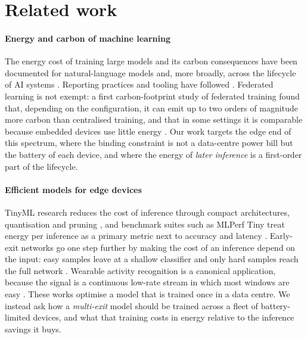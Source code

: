 \section{Related work}\label{sec:related}

\paragraph{Energy and carbon of machine learning}
The energy cost of training large models and its carbon consequences have been documented for natural-language models \citep{strubell2019energy,patterson2021carbon} and, more broadly, across the lifecycle of AI systems \citep{wu2022sustainable}. Reporting practices and tooling have followed \citep{henderson2020towards,you2023zeus}. Federated learning is not exempt: a first carbon-footprint study of federated training found that, depending on the configuration, it can emit up to two orders of magnitude more carbon than centralised training, and that in some settings it is comparable because embedded devices use little energy \citep{qiu2023first}. Our work targets the edge end of this spectrum, where the binding constraint is not a data-centre power bill but the battery of each device, and where the energy of \emph{later inference} is a first-order part of the lifecycle.

\paragraph{Efficient models for edge devices}
TinyML research reduces the cost of inference through compact architectures, quantisation and pruning \citep{lin2020mcunet}, and benchmark suites such as MLPerf Tiny treat energy per inference as a primary metric next to accuracy and latency \citep{banbury2021mlperf}. Early-exit networks go one step further by making the cost of an inference depend on the input: easy samples leave at a shallow classifier and only hard samples reach the full network \citep{teerapittayanon2016branchynet,kaya2019shallow,scardapane2020should}. Wearable activity recognition is a canonical application, because the signal is a continuous low-rate stream in which most windows are easy \citep{hammerla2016deep,ordonez2016deep}. These works optimise a model that is trained once in a data centre. We instead ask how a \emph{multi-exit} model should be trained across a fleet of battery-limited devices, and what that training costs in energy relative to the inference savings it buys.

